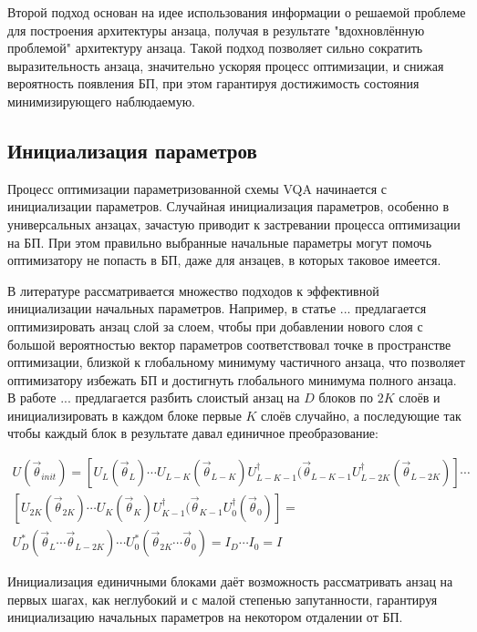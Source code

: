 \documentclass[12pt]{extarticle}
\begin{document}
\qquad Второй подход основан на идее использования информации о решаемой проблеме для построения архитектуры анзаца, получая в результате "вдохновлённую проблемой" архитектуру анзаца. Такой подход позволяет сильно сократить выразительность анзаца, значительно ускоряя процесс оптимизации, и снижая вероятность появления БП, при этом гарантируя достижимость состояния минимизирующего наблюдаемую.

\subsection{Инициализация параметров} 

\qquad Процесс оптимизации параметризованной схемы VQA начинается с инициализации параметров. Случайная инициализация параметров, особенно в универсальных анзацах, зачастую приводит к застревании процесса оптимизации на БП. При этом правильно выбранные начальные параметры могут помочь оптимизатору не попасть в БП, даже для анзацев, в которых таковое имеется.

\qquad В литературе рассматривается множество подходов к эффективной инициализации начальных параметров. Например, в статье ... предлагается оптимизировать анзац слой за слоем, чтобы при добавлении нового слоя с большой вероятностью вектор параметров соответствовал точке в пространстве оптимизации, близкой к глобальному минимуму частичного анзаца, что позволяет оптимизатору избежать БП и достигнуть глобального минимума полного анзаца. В работе ... предлагается разбить слоистый анзац на $D$ блоков по $2K$ слоёв и инициализировать в каждом блоке первые $K$ слоёв случайно, а последующие так чтобы каждый блок в результате давал единичное преобразование:

\begin{multline}
U(\vec \theta_{init}) = [U_{L}(\vec \theta_{L}) \cdots U_{L-K}(\vec \theta_{L-K}) U^{\dagger}_{L-K-1}(\vec \theta_{L-K-1} U^{\dagger}_{L-2K}(\vec \theta_{L-2K})]  \cdots \\ 
[U_{2K}(\vec \theta_{2K}) \cdots U_{K}(\vec \theta_{K}) U^{\dagger}_{K-1}(\vec \theta_{K-1} U^{\dagger}_{0}(\vec \theta_{0})] =  \\  U^{*}_{D}(\vec  \theta_{L} \cdots \vec  \theta_{L-2K}) \cdots U^{*}_{0}(\vec \theta_{2K} \cdots \vec  \theta_{0}) =  I_{D} \cdots I_{0} = I
\end{multline}

\qquad Инициализация единичными блоками даёт возможность рассматривать анзац на первых шагах, как неглубокий и с малой степенью запутанности, гарантируя инициализацию начальных параметров на некотором отдалении от БП. 
\end{document}
